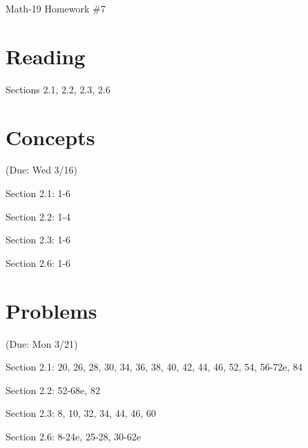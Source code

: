 \documentclass[letterpaper,12pt,fleqn]{article}
\begin{document}
\begin{center}
\Large Math-19 Homework \#7
\end{center}

\section*{Reading}

Sections 2.1, 2.2, 2.3, 2.6

\section*{Concepts}

(Due: Wed 3/16)

Section 2.1: 1-6

Section 2.2: 1-4

Section 2.3: 1-6

Section 2.6: 1-6

\section*{Problems}

(Due: Mon 3/21)

Section 2.1: 20, 26, 28, 30, 34, 36, 38, 40, 42, 44, 46, 52, 54, 56-72e, 84

Section 2.2: 52-68e, 82

Section 2.3: 8, 10, 32, 34, 44, 46, 60

Section 2.6: 8-24e, 25-28, 30-62e
\end{document}
